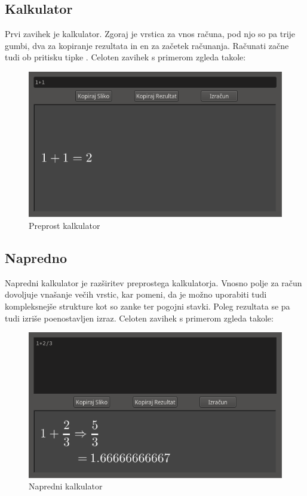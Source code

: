 \documentclass[12pt]{report}
\begin{document}
		\parbox{\textwidth}{
		\subsection{Kalkulator}
			Prvi zavihek je  kalkulator.
			Zgoraj je vrstica za vnos računa, pod njo so pa trije gumbi, dva za kopiranje rezultata in en za začetek računanja.
			Računati začne tudi ob pritisku tipke .
			Celoten zavihek s primerom zgleda takole:
			\begin{figure}[H]
				\centering
				\includegraphics{mw_calc.png}
				\caption{Preprost kalkulator}
				\label{fig:mw_calc}
			\end{figure}}
		\parbox{\textwidth}{
		\subsection{Napredno}
			Napredni kalkulator je razširitev preprostega kalkulatorja.
			Vnosno polje za račun dovoljuje vnašanje večih vrstic, kar pomeni, da je možno uporabiti tudi kompleksnejše strukture kot so zanke ter pogojni stavki.
			Poleg rezultata se pa tudi izriše poenostavljen izraz.
			Celoten zavihek s primerom zgleda takole:
			\begin{figure}[H]
				\centering
				\includegraphics{mw_adv.png}
				\caption{Napredni kalkulator}
				\label{fig:mw_adv}
			\end{figure}}
\end{document}
